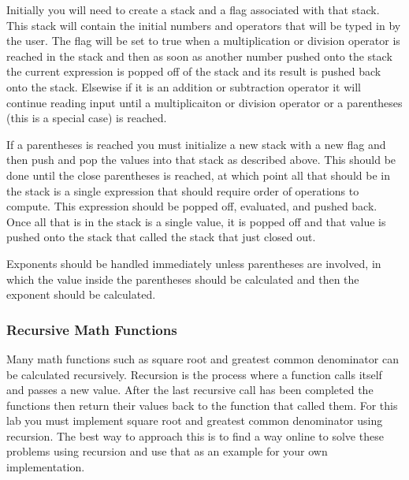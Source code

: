 Initially you will need to create a stack and a flag associated with that stack.  This stack will contain the initial numbers and operators that will be typed in by the user.  The flag will be set to true when a multiplication or division operator is reached in the stack and then as soon as another number pushed onto the stack the current expression is popped off of the stack and its result is pushed back onto the stack.  Elsewise if it is an addition or subtraction operator it will continue reading input until a multiplicaiton or division operator or a parentheses (this is a special case) is reached.

If a parentheses is reached you must initialize a new stack with a new flag and then push and pop the values into that stack as described above.  This should be done until the close parentheses is reached, at which point all that should be in the stack is a single expression that should require order of operations to compute.  This expression should be popped off, evaluated, and pushed back.  Once all that is in the stack is a single value, it is popped off and that value is pushed onto the stack that called the stack that just closed out.

Exponents should be handled immediately unless parentheses are involved, in which the value inside the parentheses should be calculated and then the exponent should be calculated.

\subsubsection{Recursive Math Functions}
Many math functions such as square root and greatest common denominator can be calculated recursively.  Recursion is the process where a function calls itself and passes a new value.  After the last recursive call has been completed the functions then return their values back to the function that called them.  For this lab you must implement square root and greatest common denominator using recursion.  The best way to approach this is to find a way online to solve these problems using recursion and use that as an example for your own implementation.